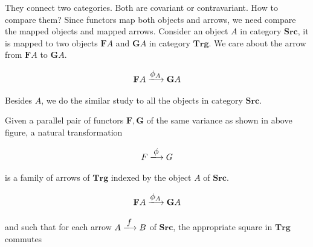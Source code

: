 \documentclass[b5paper]{article}
\begin{document}
They connect two categories. Both are covariant or contravariant. How to compare them? Since functors map both objects and arrows, we need compare the mapped objects and mapped arrows. Consider an object $A$ in category $\pmb{Src}$, it is mapped to two objects $\mathbf{F}A$ and $\mathbf{G}A$ in category $\pmb{Trg}$. We care about the arrow from $\mathbf{F}A$ to $\mathbf{G}A$.

\[
\mathbf{F}A \arrowto{\phi_A} \mathbf{G}A
\]

Besides $A$, we do the similar study to all the objects in category $\pmb{Src}$.

\begin{definition}
\normalfont
Given a parallel pair of functors $\mathbf{F}, \mathbf{G}$ of the same variance as shown in above figure, a natural transformation

\[
F \arrowto{\phi} G
\]

is a family of arrows of $\pmb{Trg}$ indexed by the object $A$ of $\pmb{Src}$.

\[
\mathbf{F}A \arrowto{\phi_A} \mathbf{G}A
\]

and such that for each arrow $A \arrowto{f} B$ of $\pmb{Src}$, the appropriate square in $\pmb{Trg}$ commutes

\begin{center}

 \quad \quad \quad {}
\end{center}
\end{definition}
\end{document}
